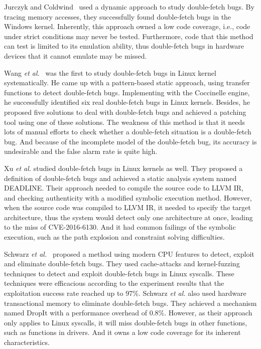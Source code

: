 \documentclass[10pt]{llncs}
\begin{document}
Jurczyk and Coldwind~\cite{bochspwn,jurczyk2013identifying} used a dynamic approach to study double-fetch bugs. By tracing memory accesses, they successfully found double-fetch bugs in the Windows kernel. Inherently, this approach owned a low code coverage, i.e., code under strict conditions may never be tested. Furthermore, code that this method can test is limited to its emulation ability, thus double-fetch bugs in hardware devices that it cannot emulate may be missed. 

Wang \textit{et al.}~\cite{wang} was the first to study double-fetch bugs in Linux kernel systematically. He came up with a pattern-based static approach, using transfer functions to detect double-fetch bugs.
Implementing with the Coccinelle engine, he successfully identified six real double-fetch bugs in Linux kernels. Besides, he proposed five solutions to deal with double-fetch bugs and achieved a patching tool using one of these solutions. The weakness of this method is that it needs lots of manual efforts to check whether a double-fetch situation is a double-fetch bug. And because of the incomplete model of the double-fetch bug, its accuracy is undesirable and the false alarm rate is quite high.

Xu \textit{et al.}\cite{precise} studied double-fetch bugs in Linux kernels as well. They proposed a definition of double-fetch bugs and achieved a static analysis system named DEADLINE. Their approach needed to compile the source code to LLVM IR, and checking authenticity with a modified symbolic execution method. However, when the source code was compiled to LLVM IR, it needed to specify the target architecture, thus the system would detect only one architecture at once, leading to the miss of CVE-2016-6130. And it had common failings of the symbolic execution, such as the path explosion and constraint solving difficulties.

Schwarz \textit{et al.}~\cite{modern} proposed a method using modern CPU features to detect, exploit and eliminate double-fetch bugs. They used cache-attacks and kernel-fuzzing techniques to detect and exploit double-fetch bugs in Linux syscalls. These techniques were efficacious according to the experiment results that the exploitation success rate reached up to 97\%. Schwarz \textit{et al.} also used hardware transactional memory to eliminate double-fetch bugs. They achieved a mechanism named DropIt with a performance overhead of 0.8\%. However, as their approach only applies to Linux syscalls, it will miss double-fetch bugs in other functions, such as functions in drivers. And it owns a low code coverage for its inherent characteristics.
\end{document}

